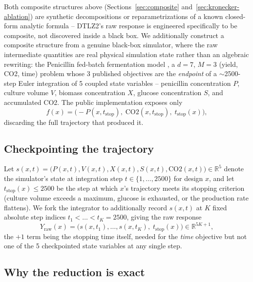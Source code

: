 \documentclass[11pt]{article}
\begin{document}
Both composite structures above (Sections~\ref{sec:composite}
and~\ref{sec:kronecker-ablation}) are synthetic decompositions or
reparametrizations of a known closed-form analytic formula -- DTLZ2's raw
response is engineered specifically to be composite, not discovered inside
a black box. We additionally construct a composite structure from a
genuine black-box simulator, where the raw intermediate quantities are real
physical simulation state rather than an algebraic rewriting: the
Penicillin fed-batch fermentation model \citep{liang2021penicillin}, a
$d=7$, $M=3$ (yield, CO2, time) problem whose 3 published objectives are
the \emph{endpoint} of a $\sim$2500-step Euler integration of 5 coupled
state variables -- penicillin concentration $P$, culture volume $V$,
biomass concentration $X$, glucose concentration $S$, and accumulated CO2.
The public implementation exposes only
\begin{equation}
  f(x) = \big(-P(x, t_{\mathrm{stop}}),\; \mathrm{CO2}(x, t_{\mathrm{stop}}),\; t_{\mathrm{stop}}(x)\big),
\end{equation}
discarding the full trajectory that produced it.

\subsection{Checkpointing the trajectory}

Let $s(x, t) = \big(P(x,t), V(x,t), X(x,t), S(x,t), \mathrm{CO2}(x,t)\big) \in \mathbb{R}^5$
denote the simulator's state at integration step $t \in \{1, \dots, 2500\}$
for design $x$, and let $t_{\mathrm{stop}}(x) \le 2500$ be the step at which
$x$'s trajectory meets its stopping criterion (culture volume exceeds a
maximum, glucose is exhausted, or the production rate flattens). We fork
the integrator to additionally record $s(x, t)$ at $K$ fixed absolute step
indices $t_1 < \dots < t_K = 2500$, giving the raw response
\begin{equation}
  Y_{\mathrm{raw}}(x) = \big(s(x, t_1), \dots, s(x, t_K),\; t_{\mathrm{stop}}(x)\big) \in \mathbb{R}^{5K+1},
\end{equation}
the $+1$ term being the stopping time itself, needed for the \emph{time}
objective but not one of the 5 checkpointed state variables at any single
step.

\subsection{Why the reduction is exact}
\end{document}
